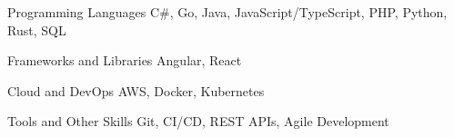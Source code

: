 
\begin{cvskills}

  \cvskill
    {Programming Languages}
    {C\#, Go, Java, JavaScript/TypeScript, PHP, Python, Rust, SQL}

  \cvskill
    {Frameworks and Libraries}
    {Angular, React}

  \cvskill
    {Cloud and DevOps}
    {AWS, Docker, Kubernetes}

  \cvskill
    {Tools and Other Skills}
    {Git, CI/CD, REST APIs, Agile Development}

\end{cvskills}
